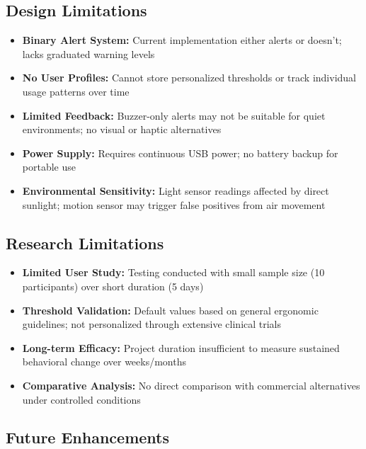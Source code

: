 \documentclass[12pt,a4paper]{article}
\begin{document}
\subsection{Design Limitations}

\begin{itemize}
\item \textbf{Binary Alert System:} Current implementation either alerts or doesn't; lacks graduated warning levels

\item \textbf{No User Profiles:} Cannot store personalized thresholds or track individual usage patterns over time

\item \textbf{Limited Feedback:} Buzzer-only alerts may not be suitable for quiet environments; no visual or haptic alternatives

\item \textbf{Power Supply:} Requires continuous USB power; no battery backup for portable use

\item \textbf{Environmental Sensitivity:} Light sensor readings affected by direct sunlight; motion sensor may trigger false positives from air movement
\end{itemize}

\subsection{Research Limitations}

\begin{itemize}
\item \textbf{Limited User Study:} Testing conducted with small sample size (10 participants) over short duration (5 days)

\item \textbf{Threshold Validation:} Default values based on general ergonomic guidelines; not personalized through extensive clinical trials

\item \textbf{Long-term Efficacy:} Project duration insufficient to measure sustained behavioral change over weeks/months

\item \textbf{Comparative Analysis:} No direct comparison with commercial alternatives under controlled conditions
\end{itemize}

\subsection{Future Enhancements}
\end{document}
